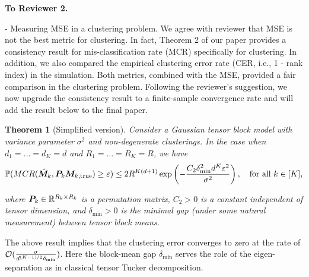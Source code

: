 \documentclass{article}
\newtheorem{thm}{Theorem}[section]
\begin{document}
{\bf To Reviewer 2.}
\vspace{-.15cm}

- Measuring MSE in a clustering problem. We agree with reviewer that MSE is not the best metric for clustering. In fact, Theorem 2 of our paper provides a consistency result for mis-classification rate (MCR) specifically for clustering. In addition, we also compared the empirical clustering error rate (CER, i.e., 1 - rank index) in the simulation. Both metrics, combined with the MSE, provided a fair comparison in the clustering problem. 
Following the reviewer's suggestion, we now upgrade the consistency result to a finite-sample convergence rate and will add the result below to the final paper.  
\begin{thm} [Simplified version]
Consider a Gaussian tensor block model with variance parameter $\sigma^2$ and non-degenerate clusterings. In the case when $d_1=\ldots=d_K=d$ and $R_1=\ldots=R_K=R$, we have
\vspace{-.05cm}
\[
\mathbb{P}(MCR(\hat {\bm M}_k,\bm{P}_k\bm M_{k,\text{true}})\geq \varepsilon)\leq 2R^{K(d+1)} \exp\left( - {C_2  \delta_{\min}^2  d^K\varepsilon^2\over \sigma^2 }
\right),\quad \text{for all }k\in[K],
\]
\vspace{-.4cm}

where $\bm{P}_k\in\mathbb{R}^{R_k\times R_k}$ is a permutation matrix, $C_2>0$ is a constant independent of tensor dimension, and $\delta_{\min}>0$ is the minimal gap (under some natural measurement) between tensor block means. 
\end{thm}
\vspace{-.3cm}
The above result implies that the clustering error converges to zero at the rate of $\mathcal{O}({\sigma \over d^{(K-1)/2}\delta_{\min} })$. Here the block-mean gap $\delta_{\min}$ serves the role of the eigen-separation as in classical tensor Tucker decomposition. 
\end{document}
